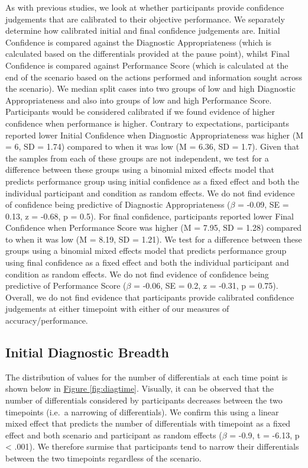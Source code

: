 \documentclass[a4paper, nobind]{templates/ociamthesis}
\begin{document}
\hfill\break
As with previous studies, we look at whether participants provide confidence judgements that are calibrated to their objective performance. We separately determine how calibrated initial and final confidence judgements are. Initial Confidence is compared against the Diagnostic Appropriateness (which is calculated based on the differentials provided at the pause point), whilst Final Confidence is compared against Performance Score (which is calculated at the end of the scenario based on the actions performed and information sought across the scenario). We median split cases into two groups of low and high Diagnostic Appropriateness and also into groups of low and high Performance Score. Participants would be considered calibrated if we found evidence of higher confidence when performance is higher. Contrary to expectations, participants reported lower Initial Confidence when Diagnostic Appropriateness was higher (M = 6, SD = 1.74) compared to when it was low (M = 6.36, SD = 1.7). Given that the samples from each of these groups are not independent, we test for a difference between these groups using a binomial mixed effects model that predicts performance group using initial confidence as a fixed effect and both the individual participant and condition as random effects. We do not find evidence of confidence being predictive of Diagnostic Appropriateness (\(\beta\) = -0.09, SE = 0.13, z = -0.68, p = 0.5). For final confidence, participants reported lower Final Confidence when Performance Score was higher (M = 7.95, SD = 1.28) compared to when it was low (M = 8.19, SD = 1.21). We test for a difference between these groups using a binomial mixed effects model that predicts performance group using final confidence as a fixed effect and both the individual participant and condition as random effects. We do not find evidence of confidence being predictive of Performance Score (\(\beta\) = -0.06, SE = 0.2, z = -0.31, p = 0.75). Overall, we do not find evidence that participants provide calibrated confidence judgements at either timepoint with either of our measures of accuracy/performance.

\subsection{Initial Diagnostic Breadth}\label{initial-diagnostic-breadth}

The distribution of values for the number of differentials at each time point is shown below in \hyperref[fig:diagtime]{Figure \ref{fig:diagtime}}. Visually, it can be observed that the number of differentials considered by participants decreases between the two timepoints (i.e.~a narrowing of differentials). We confirm this using a linear mixed effect that predicts the number of differentials with timepoint as a fixed effect and both scenario and participant as random effects (\(\beta\) = -0.9, t = -6.13, p \textless{} .001). We therefore surmise that participants tend to narrow their differentials between the two timepoints regardless of the scenario.
\end{document}
